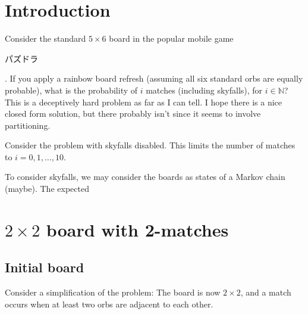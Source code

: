 \documentclass[12pt]{article}
\newcommand{\N}{\mathbb{N}}
\begin{document}
\tableofcontents
\section{Introduction}
Consider the standard $5\times 6$ board in the popular mobile game \begin{CJK}{UTF8}{min}パズドラ\end{CJK}. If you apply a rainbow board refresh (assuming all six standard orbs are equally probable), what is the probability of $i$ matches (including skyfalls), for $i\in\N$?
This is a deceptively hard problem as far as I can tell. I hope there is a nice closed form solution, but there probably isn't since it seems to involve partitioning.

Consider the problem with skyfalls disabled.
This limits the number of matches to $i=0,1,\dots,10$.

To consider skyfalls, we may consider the boards as states of a Markov chain (maybe). The expected 

\section{$2\times2$ board with 2-matches}
\subsection{Initial board}
Consider a simplification of the problem:
The board is now $2 \times 2$, and a match occurs when at least two orbs are adjacent to each other.
\end{document}
